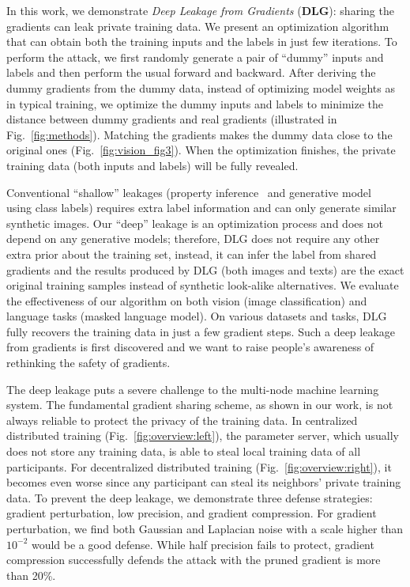 In this work, we demonstrate \emph{Deep Leakage from Gradients} (\textbf{DLG}): 
sharing the gradients can leak private training data.
We present an optimization algorithm that can obtain both the training inputs and the labels in just few iterations. To perform the attack, we first randomly generate a pair of ``dummy'' inputs and labels and then perform the usual forward and backward. After deriving the dummy gradients from the dummy data, instead of optimizing model weights as in typical training, we optimize the dummy inputs and labels to minimize the distance between dummy gradients and real gradients (illustrated in Fig.~\ref{fig:methods}).
Matching the gradients makes the dummy data close to the original ones (Fig.~\ref{fig:vision_fig3}). 
When the optimization finishes, the private training data (both inputs and labels) will be fully revealed.

Conventional ``shallow'' leakages (property inference~\cite{shokri2017membership, Melis2018unintended} and generative model~\cite{hitaj2017information} using class labels) requires extra label information and can only generate similar synthetic images. 
Our ``deep'' leakage is an optimization process and does not depend on any generative models; therefore, DLG does not require any other extra prior about the training set, instead, it can infer the label from shared gradients and the results produced by DLG (both images and texts) are the exact original training samples instead of synthetic look-alike alternatives.
% 
We evaluate the effectiveness of our algorithm on both vision (image classification) and language tasks (masked language model). On various datasets and tasks, DLG fully recovers the training data in just a few gradient steps. 
% 
Such a deep leakage from gradients is first discovered and we want to raise people's awareness of rethinking the safety of gradients. 

The deep leakage puts a severe challenge to the multi-node machine learning system. 
% 
The fundamental gradient sharing scheme, as shown in our work, is not always reliable to protect the privacy of the training data.  
% 
In centralized distributed training (Fig.~\ref{fig:overview:left}), the parameter server, which usually does not store any training data, is able to steal local training data of all participants. For decentralized distributed training (Fig.~\ref{fig:overview:right}), it becomes even worse since any participant can steal its neighbors' private training data.
% 
To prevent the deep leakage, we demonstrate three defense strategies: gradient perturbation, low precision, and gradient compression. For gradient perturbation, we find both Gaussian and Laplacian noise with a scale higher than $10^{-2}$ would be a good defense. While half precision fails to protect, gradient compression successfully defends the attack with the pruned gradient is more than 20\%.

